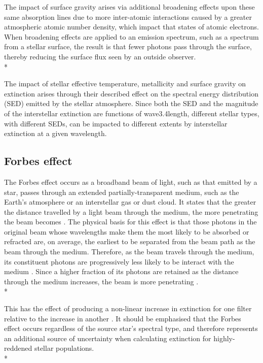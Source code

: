 \documentclass[12pt, a4paper]{report}
\begin{document}
The impact of surface gravity arises via additional broadening effects upon these same absorption lines due to more inter-atomic interactions caused by a greater atmospheric atomic number density, which impact that states of atomic electrons. When broadening effects are applied to an emission spectrum, such as a spectrum from a stellar surface, the result is that fewer photons pass through the surface, thereby reducing the surface flux seen by an outside observer. \\*

The impact of stellar effective temperature, metallicity and surface gravity on extinction arises through their described effect on the spectral energy distribution (SED) emitted by the stellar atmosphere. Since both the SED and the magnitude of the interstellar extinction are functions of wave3.4length, different stellar types, with different SEDs, can be impacted to different extents by interstellar extinction at a given wavelength.

\subsection{Forbes effect} \label{forbes}
The Forbes effect occurs as a broadband beam of light, such as that emitted by a star, passes through an extended partially-transparent medium, such as the Earth's atmosphere or an interstellar gas or dust cloud. It states that the greater the distance travelled by a light beam through the medium, the more penetrating the beam becomes \citep{1842RSPT..132..225F}. The physical basis for this effect is that those photons in the original beam whose wavelengths make them the most likely to be absorbed or refracted are, on average, the earliest to be separated from the beam path as the beam through the medium. Therefore, as the beam travels through the medium, its constituent photons are progressively less likely to be interact with the medium \citep{1995A&AS..109..293G}. Since a higher fraction of its photons are retained as the distance through the medium increases, the beam is more penetrating \citep{OHVRIL1999305}.\\*

This has the effect of producing a non-linear increase in extinction for one filter relative to the increase in another \citep{1995A&AS..109..293G,2008PASP..120..583G}. It should be emphasised that the Forbes effect occurs regardless of the source star's spectral type, and therefore represents an additional source of uncertainty when calculating extinction for highly-reddened stellar populations. \\*
\end{document}

